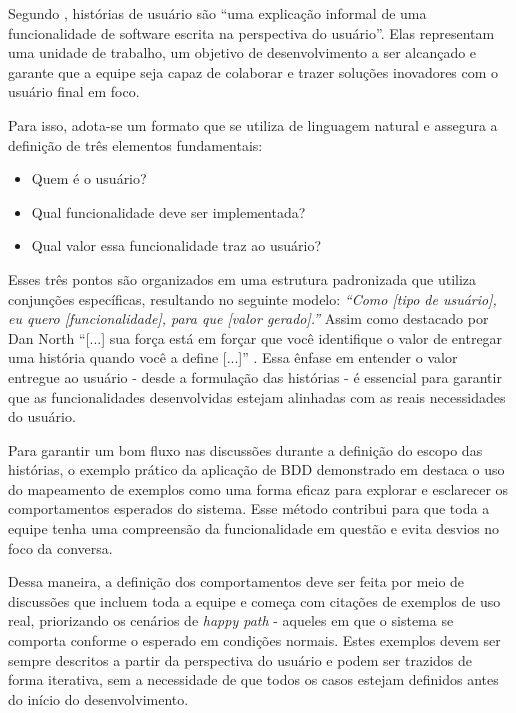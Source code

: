 Segundo , histórias de usuário são ``uma explicação informal de uma funcionalidade de software escrita na perspectiva do usuário''. Elas 
representam uma unidade de trabalho, um objetivo de desenvolvimento a ser alcançado e garante que a equipe seja capaz de colaborar e trazer soluções inovadores 
com o usuário final em foco.

Para isso, adota-se um formato que se utiliza de linguagem natural e assegura a definição de três elementos fundamentais:

\begin{itemize}
	\item Quem é o usuário?
	\item Qual funcionalidade deve ser implementada?
	\item Qual valor essa funcionalidade traz ao usuário?
\end{itemize}

Esses três pontos são organizados em uma estrutura padronizada que utiliza conjunções específicas, resultando no seguinte modelo:
\textit{``Como [tipo de usuário], eu quero [funcionalidade], para que [valor gerado].''}
Assim como destacado por Dan North ``[...] sua força está em forçar que você identifique o valor de entregar uma história quando você a define [...]'' 
\cite{north2006bdd}. Essa ênfase em entender o valor entregue ao usuário - desde a formulação das histórias - é essencial para garantir que as funcionalidades 
desenvolvidas estejam alinhadas com as reais necessidades do usuário. 

Para garantir um bom fluxo nas discussões durante a definição do escopo das histórias, o exemplo prático da aplicação de BDD demonstrado em  
destaca o uso do mapeamento de exemplos como uma forma eficaz para explorar e esclarecer os comportamentos esperados do sistema. Esse método contribui para que 
toda a equipe tenha uma compreensão da funcionalidade em questão e evita desvios no foco da conversa.

Dessa maneira, a definição dos comportamentos deve ser feita por meio de discussões que incluem toda a equipe e começa com citações de exemplos de uso real, priorizando 
os cenários de \textit{happy path} - aqueles em que o sistema se comporta conforme o esperado em condições normais. Estes exemplos devem ser sempre descritos a partir da 
perspectiva do usuário e podem ser trazidos de forma iterativa, sem a necessidade de que todos os casos estejam definidos antes do início do desenvolvimento.

